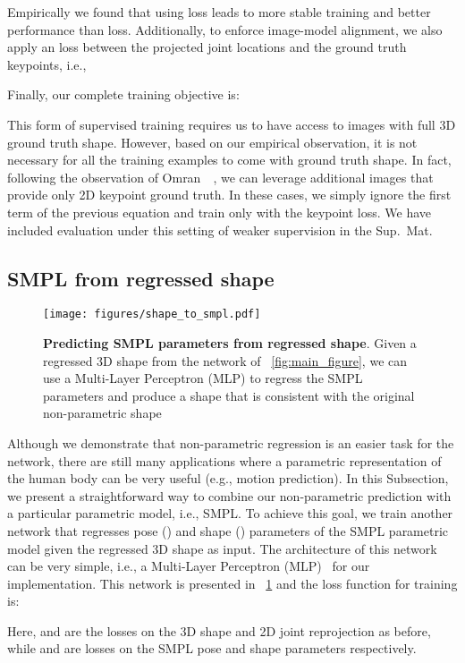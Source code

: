 Empirically we found that using  loss leads to more stable training and better performance than  loss. Additionally, to enforce image-model alignment, we also apply an  loss between the projected joint locations and the ground truth keypoints, i.e.,

Finally, our complete training objective is:


This form of supervised training requires us to have access to images with full 3D ground truth shape. However, based on our empirical observation, it is not necessary for all the training examples to come with ground truth shape. In fact, following the observation of Omran~\etal~\cite{omran2018neural}, we can leverage additional images that provide only 2D keypoint ground truth. In these cases, we simply ignore the first term of the previous equation and train only with the keypoint loss. We have included evaluation under this setting of weaker supervision in the Sup.~Mat.

\subsection{SMPL from regressed shape}\label{sec:s2s}
\begin{figure}[!t]
    \centering
    \texttt{[image: figures/shape\_to\_smpl.pdf]}
    \caption{\textbf{Predicting SMPL parameters from regressed shape}. Given a regressed 3D shape from the network of \figurename~\ref{fig:main_figure}, we can use a Multi-Layer Perceptron (MLP) to regress the SMPL parameters and produce a shape that is consistent with the original non-parametric shape}
    \label{fig:shape_to_smpl}
	\vspace*{-1.0em}
\end{figure}
Although we demonstrate that non-parametric regression is an easier task for the network, there are still many applications where a parametric representation of the human body can be very useful (e.g., motion prediction). In this Subsection, we present a straightforward way to combine our non-parametric prediction with a particular parametric model, i.e., SMPL. To achieve this goal, we train another network that regresses pose () and shape () parameters of the SMPL parametric model given the regressed 3D shape as input. The architecture of this network can be very simple, i.e., a Multi-Layer Perceptron (MLP)~\cite{rumelhart86} for our implementation. This network is presented in \figurename~\ref{fig:shape_to_smpl} and the loss function for training is:

Here,  and  are the losses on the 3D shape and 2D joint reprojection as before, while  and  are  losses on the SMPL pose and shape parameters respectively.

